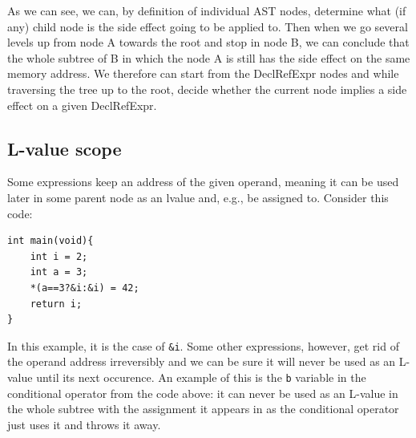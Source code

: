 As we can see, we can, by definition of individual AST nodes, determine what (if any) child node is the side effect going to be applied to. Then when we go several levels up from node A towards the root and stop in node B, we can conclude that the whole subtree of B in which the node A is still has the side effect on the same memory address. We therefore can start from the DeclRefExpr nodes and while traversing the tree up to the root, decide whether the current node implies a side effect on a given DeclRefExpr.

\subsection{L-value scope}
Some expressions keep an address of the given operand, meaning it can be used later in some parent node as an lvalue and, e.g., be assigned to. Consider this code:

\begin{lstlisting}
int main(void){
    int i = 2;
    int a = 3;
    *(a==3?&i:&i) = 42;
    return i;
}

\end{lstlisting}

In this example, it is the case of \verb|&i|. Some other expressions, however, get rid of the operand address irreversibly and we can be sure it will never be used as an L-value until its next occurence. An example of this is the \verb|b| variable in the conditional operator from the code above: it can never be used as an L-value in the whole subtree with the assignment it appears in as the conditional operator just uses it and throws it away.

